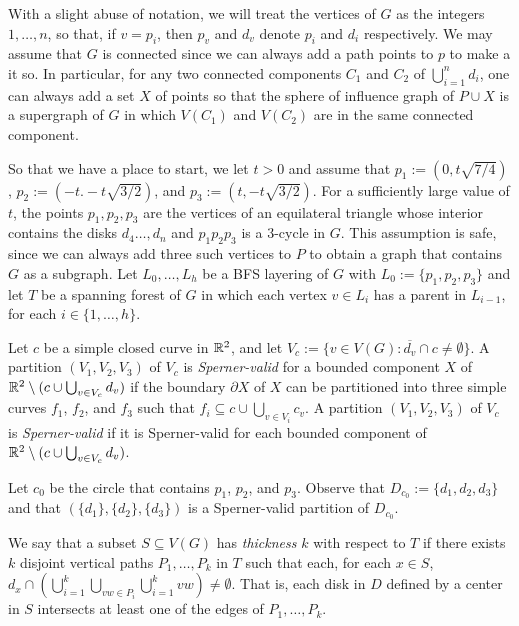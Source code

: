 \documentclass{patmorin}
\begin{document}
With a slight abuse of notation, we will treat the vertices of $G$ as the integers $1,\ldots,n$, so that, if $v=p_i$, then $p_v$ and $d_v$ denote $p_i$ and $d_i$ respectively.  We may assume that $G$ is connected since we can always add a path points to $p$ to make a it so.  In particular, for any two connected components $C_1$ and $C_2$ of $\bigcup_{i=1}^n d_i$, one can always add a set $X$ of points so that the sphere of influence graph of $P\cup X$ is a supergraph of $G$ in which $V(C_1)$ and $V(C_2)$ are in the same connected component.

So that we have a place to start, we let $t>0$ and assume that $p_1:=(0,t\sqrt{7/4})$, $p_2:=(-t. -t\sqrt{3/2})$, and $p_3:=(t, -t\sqrt{3/2})$.  For a sufficiently large value of $t$, the points $p_1,p_2,p_3$ are the vertices of an equilateral triangle whose interior contains the disks $d_4\ldots,d_n$ and $p_1p_2p_3$ is a $3$-cycle in $G$.  This assumption is safe, since we can always add three such vertices to $P$ to obtain a graph that contains $G$ as a subgraph.  Let $L_0,\ldots,L_h$ be a BFS layering of $G$ with $L_0:=\{p_1,p_2,p_3\}$ and let $T$ be a spanning forest of $G$ in which each vertex $v\in L_i$ has a parent in $L_{i-1}$, for each $i\in\{1,\ldots,h\}$.

Let $c$ be a simple closed curve in $\mathbb{R}^2$, and let $V_c:=\{v\in V(G):\overline{d_v}\cap c\neq\emptyset\}$.  A partition $(V_1,V_2,V_3)$ of $V_c$ is \emph{Sperner-valid} for a bounded component $X$ of $\mathbb{R}^2\setminus (c\cup \bigcup_{v\in V_c} d_v)$ if the boundary $\partial X$ of $X$ can be partitioned into three simple curves $f_1$, $f_2$, and $f_3$ such that $f_i\subseteq c\cup \bigcup_{v\in V_i}c_v$.  A partition $(V_1,V_2,V_3)$ of $V_c$ is \emph{Sperner-valid} if it is Sperner-valid for each bounded component of $\mathbb{R}^2\setminus (c\cup \bigcup_{v\in V_c} d_v)$.

Let $c_0$ be the circle that contains $p_1$, $p_2$, and $p_3$.   Observe that $D_{c_0}:=\{d_1,d_2,d_3\}$ and that $(\{d_1\},\{d_2\},\{d_3\})$ is a Sperner-valid partition of $D_{c_0}$.

We say that a subset $S\subseteq V(G)$ has \emph{thickness} $k$ with respect to $T$ if there exists $k$ disjoint vertical paths $P_1,\ldots,P_k$ in $T$ such that each, for each $x\in S$, $d_x \cap (\bigcup_{i=1}^k\bigcup_{vw\in P_i}\bigcup_{i=1}^k vw)\neq\emptyset$.  That is, each disk in $D$ defined by a center in $S$ intersects at least one of the edges of $P_1,\ldots,P_k$.
\end{document}
